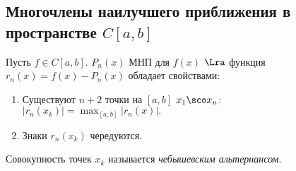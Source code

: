 \documentclass[a4paper]{article}
\begin{document}
\subsection{Многочлены наилучшего приближения в пространстве $C[a,b]$}
\begin{theorem}[Чебышев]
Пусть $f\in C[a,b]$. $P_n(x)$ МНП для $f(x)$ $\Lra$
функция $r_n(x)=f(x)-P_n(x)$ обладает свойствами:
\begin{enumerate}
\item
Существуют $n+2$ точки на $[a,b]$ $x_1\sco x_n$:
$|r_n(x_k)|=\max_{[a,b]}|r_n(x)|.$
\item
Знаки $r_n(x_k)$ чередуются.
\end{enumerate}
\end{theorem}
\begin{df}
  Совокупность точек $x_k$ называется \emph{чебышевским альтернансом}.
\end{df}
\end{document}
